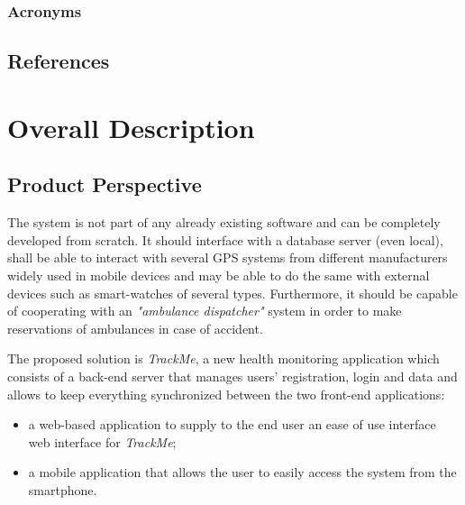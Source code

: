 \documentclass[a4paper]{article}
\begin{document}
            \subsubsection{Acronyms}
            \begin{acronym}
            \end{acronym}
            
    \subsection{References}
        \printbibliography[heading=none]
\newpage
\section{Overall Description}
    \subsection{Product Perspective}
    
    The system is not part of any already existing software and can be completely developed from scratch. It should interface with a database server (even local), shall be able to interact with several GPS systems from different manufacturers widely used in mobile devices and may be able to do the same with external devices such as smart-watches of several types. Furthermore, it should be capable of cooperating with an \textit{"ambulance dispatcher"} system in order to make reservations of ambulances in case of accident.
    
    The proposed solution is \textit{TrackMe}, a new health monitoring application which consists of a back-end server that manages users' registration, login and data and allows to keep everything synchronized between the two front-end applications:
        \begin{itemize}
            \item a web-based application to supply to the end user an ease of use interface web interface for \textit{TrackMe};
            \item a mobile application that allows the user to easily access the system from the smartphone.
        \end{itemize}
    
\end{document}
